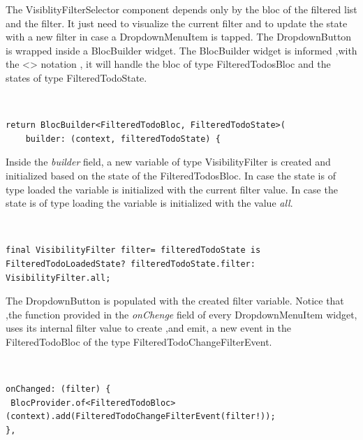 The VisiblityFilterSelector component depends only by the bloc of the filtered list and the filter. It just need to visualize the current filter and to update the state with a new filter in case a DropdownMenuItem is tapped. The DropdownButton is  wrapped inside a BlocBuilder widget. The BlocBuilder widget is informed ,with the <> notation , it will handle the bloc of type FilteredTodosBloc and the states of type FilteredTodoState. 
\begin{code}
\mbox{}\\
 \mbox{}
\label{code:2.14}
\begin{verbatim}
return BlocBuilder<FilteredTodoBloc, FilteredTodoState>(
    builder: (context, filteredTodoState) {
\end{verbatim}
\mbox{}
\end{code}

Inside the \textit{builder }field, a new variable of type VisibilityFilter is created and initialized based on the state of the FilteredTodosBloc. In case the state is of type loaded the variable is initialized with the current filter value. In case the state is of type loading the variable is initialized with the value \textit{all}.
\begin{code}
\mbox{}\\
 \mbox{}
\label{code:2.14}
\begin{verbatim}
final VisibilityFilter filter= filteredTodoState is FilteredTodoLoadedState? filteredTodoState.filter: VisibilityFilter.all;
\end{verbatim}
\mbox{}
\end{code}

The DropdownButton is populated with the created filter variable. Notice that ,the function provided in the \textit{onChenge} field of every DropdownMenuItem widget, uses its internal filter value to create ,and  emit, a new event in the FilteredTodoBloc of the type FilteredTodoChangeFilterEvent.
\begin{code}
\mbox{}\\
 \mbox{}
\label{code:2.14}
\begin{verbatim}
onChanged: (filter) {
 BlocProvider.of<FilteredTodoBloc>(context).add(FilteredTodoChangeFilterEvent(filter!));
},
\end{verbatim}
\mbox{}
\end{code}
